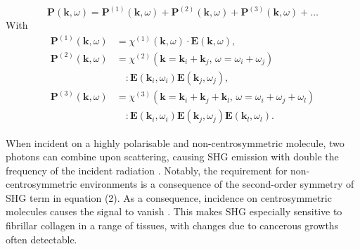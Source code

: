 \begin{equation} \label{eq:polarisation}
\mathbf{P}(\mathbf{k}, \omega) = \mathbf{P}^{(1)}(\mathbf{k}, \omega) + \mathbf{P}^{(2)}(\mathbf{k}, \omega) + \mathbf{P}^{(3)}(\mathbf{k}, \omega) + \dots
\end{equation}
With
\begin{align*}
\mathbf{P}^{(1)}(\mathbf{k}, \omega) &= \chi^{(1)}(\mathbf{k}, \omega) \cdot \mathbf{E}(\mathbf{k}, \omega), \\
\mathbf{P}^{(2)}(\mathbf{k}, \omega) &= \chi^{(2)}(\mathbf{k} = \mathbf{k}_i + \mathbf{k}_j, \, \omega = \omega_i + \omega_j) \\
&\quad : \mathbf{E}(\mathbf{k}_i, \omega_i)\mathbf{E}(\mathbf{k}_j, \omega_j), \\
\mathbf{P}^{(3)}(\mathbf{k}, \omega) &= \chi^{(3)}(\mathbf{k} = \mathbf{k}_i + \mathbf{k}_j + \mathbf{k}_l, \, \omega = \omega_i + \omega_j + \omega_l) \\
&\quad : \mathbf{E}(\mathbf{k}_i, \omega_i)\mathbf{E}(\mathbf{k}_j, \omega_j)\mathbf{E}(\mathbf{k}_l, \omega_l).
\end{align*}

When incident on a highly polarisable and non-centrosymmetric molecule, two photons can combine upon scattering, causing SHG emission with double the frequency of the incident radiation \cite{perry_two-photon_2012}. Notably, the requirement for non-centrosymmetric environments is a consequence of the second-order symmetry of SHG term in equation (2). As a consequence, incidence on centrosymmetric molecules causes the signal to vanish \cite{chen_second_2012}. This makes SHG especially sensitive to fibrillar collagen in a range of tissues, with changes due to cancerous growths often detectable.\\

